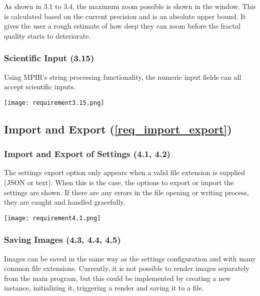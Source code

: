 As shown in 3.1 to 3.4, the maximum zoom possible is shown in the window. This is calculated based on the current precision and is an absolute upper bound. It gives the user a rough estimate of how deep they can zoom before the fractal quality starts to deteriorate.

\subsubsection{Scientific Input (3.15)}

Using MPIR's string processing functionality, the numeric input fields can all accept scientific inputs.

\FloatBarrier
\begin{figure*}[htp]
	\centering
	\texttt{[image: requirement3.15.png]}
\end{figure*}
\FloatBarrier

\subsection{Import and Export (\ref{req_import_export})}

\subsubsection{Import and Export of Settings (4.1, 4.2)}

The settings export option only appears when a valid file extension is supplied (JSON or text). When this is the case, the options to export or import the settings are shown. If there are any errors in the file opening or writing process, they are caught and handled gracefully.

\FloatBarrier
\begin{figure*}[htp]
	\centering
	\texttt{[image: requirement4.1.png]}
\end{figure*}
\FloatBarrier

\subsubsection{Saving Images (4.3, 4.4, 4.5)}

Images can be saved in the same way as the settings configuration and with many common file extensions. Currently, it is not possible to render images separately from the main program, but this could be implemented by creating a new  instance, initializing it, triggering a render and saving it to a file.


